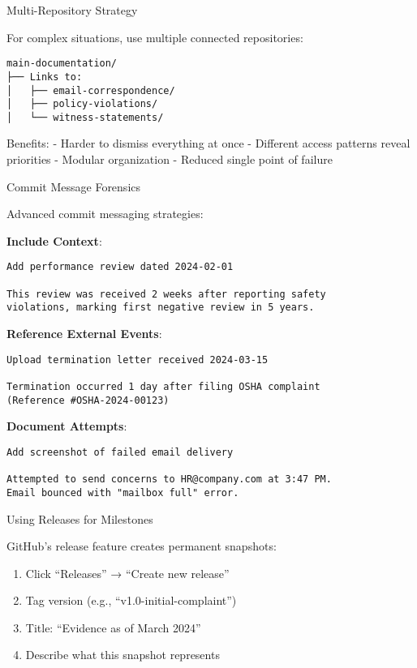 Multi-Repository Strategy

For complex situations, use multiple connected repositories:

\begin{verbatim}
main-documentation/
├── Links to:
│   ├── email-correspondence/
│   ├── policy-violations/
│   └── witness-statements/
\end{verbatim}

Benefits: - Harder to dismiss everything at once - Different access
patterns reveal priorities - Modular organization - Reduced single point
of failure

Commit Message Forensics

Advanced commit messaging strategies:

\textbf{Include Context}:

\begin{verbatim}
Add performance review dated 2024-02-01

This review was received 2 weeks after reporting safety 
violations, marking first negative review in 5 years.
\end{verbatim}

\textbf{Reference External Events}:

\begin{verbatim}
Upload termination letter received 2024-03-15

Termination occurred 1 day after filing OSHA complaint
(Reference #OSHA-2024-00123)
\end{verbatim}

\textbf{Document Attempts}:

\begin{verbatim}
Add screenshot of failed email delivery

Attempted to send concerns to HR@company.com at 3:47 PM.
Email bounced with "mailbox full" error.
\end{verbatim}

Using Releases for Milestones

GitHub's release feature creates permanent snapshots:

\begin{enumerate}
\def\labelenumi{\arabic{enumi}.}
\tightlist
\item
  Click ``Releases'' → ``Create new release''
\item
  Tag version (e.g., ``v1.0-initial-complaint'')
\item
  Title: ``Evidence as of March 2024''
\item
  Describe what this snapshot represents
\end{enumerate}

